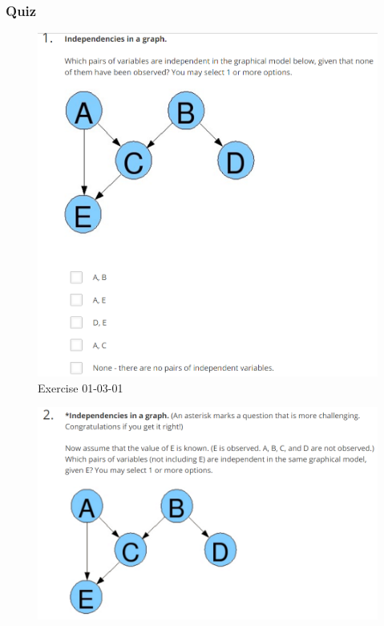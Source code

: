 \documentclass[12pt]{article}
\numberwithin{equation}{section}
\begin{document}
\subsubsection{Quiz}
\begin{figure}[H]
	\includegraphics[width=\linewidth]{PGMpics/01-03-01.png}
	\caption{Exercise 01-03-01}
	\label{fig:01-03-01}
\end{figure}
\begin{figure}[H]
	\includegraphics[width=\linewidth]{PGMpics/01-03-02-1.png}
	\label{fig:01-03-02-1}
\end{figure}
\end{document}
